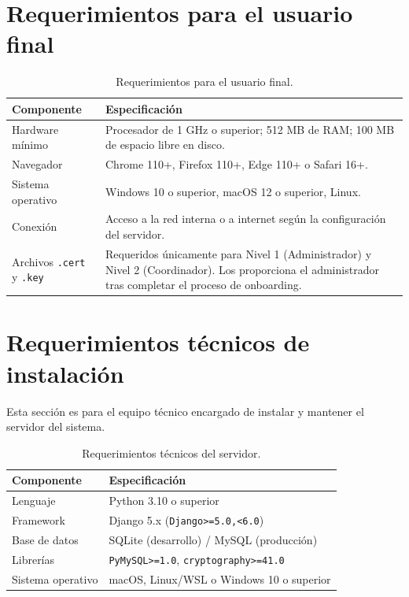 \documentclass[10pt,letterpaper]{report}
\newcommand{\paratodos}{%
  \par\smallskip\noindent
  \fbox{\small\bfseries\ Todos los niveles\ }%
  \par\medskip}
\begin{document}
\section{Requerimientos para el usuario final}
\paratodos

\begin{table}[H]\centering
\caption{Requerimientos para el usuario final.}
\label{tab:req_usuario}
\begin{tabularx}{\textwidth}{l X}
\toprule
\textbf{Componente} & \textbf{Especificación}\\
\midrule
Hardware mínimo   & Procesador de 1 GHz o superior; 512 MB de RAM; 100 MB de espacio libre en disco.\\
Navegador         & Chrome 110+, Firefox 110+, Edge 110+ o Safari 16+.\\
Sistema operativo & Windows 10 o superior, macOS 12 o superior, Linux.\\
Conexión          & Acceso a la red interna o a internet según la configuración del servidor.\\
Archivos \texttt{.cert} y \texttt{.key} & Requeridos únicamente para Nivel 1 (Administrador) y Nivel 2 (Coordinador). Los proporciona el administrador tras completar el proceso de onboarding.\\
\bottomrule
\end{tabularx}
\end{table}


\section{Requerimientos técnicos de instalación}

Esta sección es para el equipo técnico encargado de instalar y mantener el servidor del sistema.

\begin{table}[H]\centering
\caption{Requerimientos técnicos del servidor.}
\label{tab:req_servidor}
\begin{tabularx}{\textwidth}{l X}
\toprule
\textbf{Componente} & \textbf{Especificación}\\
\midrule
Lenguaje          & Python 3.10 o superior\\
Framework         & Django 5.x (\texttt{Django>=5.0,<6.0})\\
Base de datos     & SQLite (desarrollo) / MySQL (producción)\\
Librerías         & \texttt{PyMySQL>=1.0}, \texttt{cryptography>=41.0}\\
Sistema operativo & macOS, Linux/WSL o Windows 10 o superior\\
\bottomrule
\end{tabularx}
\end{table}
\end{document}
